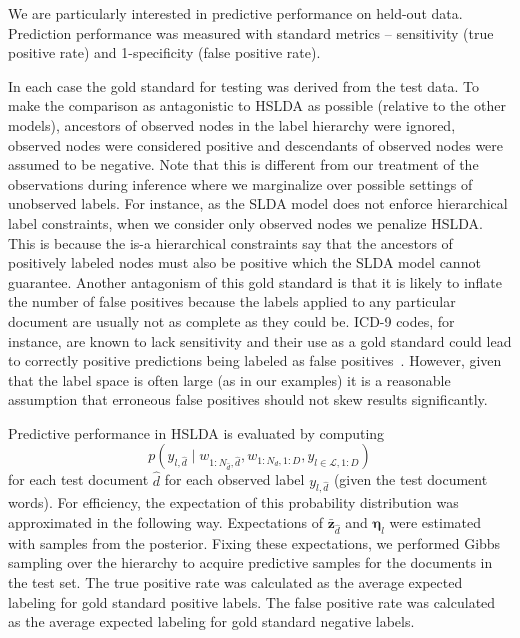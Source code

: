 
We are particularly interested in
predictive performance on held-out data. Prediction performance was measured
with standard metrics -- sensitivity (true positive rate) and 1-specificity
(false positive rate). 

In each case the gold standard for testing was derived from the test data. To make the comparison as antagonistic to HSLDA as possible (relative to the other models), ancestors of
observed nodes in the label hierarchy were ignored, observed nodes were
considered positive and descendants of observed nodes were assumed to be
negative. Note that this is different from our treatment of the observations during inference where we marginalize over possible settings of unobserved labels.
For instance, as the SLDA model does not enforce hierarchical
label constraints, when we consider only observed nodes we penalize HSLDA.  This is because
 the is-a hierarchical constraints say that the ancestors of positively labeled nodes must also be positive which the SLDA model cannot guarantee.
Another antagonism of this gold standard is that it is likely to inflate the number of false positives because
the labels applied to any particular document are usually not as complete as
they could be.  ICD-9 codes, for instance, are known to lack sensitivity and their use as a
gold standard could lead to correctly positive predictions being labeled as
false positives~\cite{Birmetal2005}.
However, given that the label space is often large (as in our examples) it is a
reasonable assumption that erroneous false positives should not skew results
significantly. 

Predictive performance in HSLDA is evaluated by computing
 \[p\left(y_{l,\hat{d}}\mid w_{1:N_{\hat{d}},\hat{d}}, w_{1:N_d,1:D},  y_{l\in\mathcal{L},1:D}\right)\] 
for each test document $\hat{d}$ for each observed label $y_{l,\hat{d}}$ (given the test document words). For efficiency, the expectation of this
probability distribution was approximated in the following way. Expectations 
of $\mathbf{\bar{z}}_{\hat{d}}$ and $\boldsymbol{\eta}_l$ were estimated with samples
from the posterior. Fixing these expectations, we performed Gibbs sampling over
the hierarchy to acquire predictive samples for the documents in the test set.
The true positive rate was calculated as the average expected labeling for
gold standard positive labels. The false positive rate was calculated 
as the average expected labeling for gold standard negative labels.

